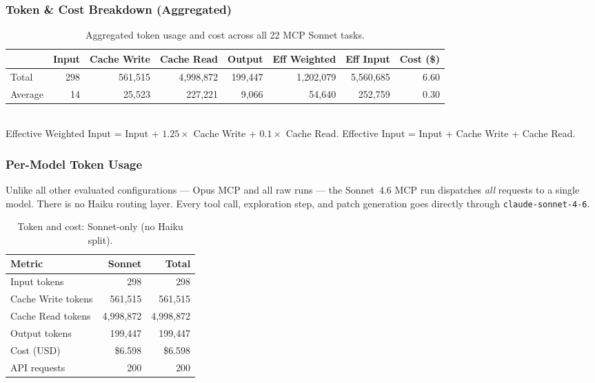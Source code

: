 \subsubsection{Token \& Cost Breakdown (Aggregated)}

\begin{table}[h]
\centering
\small
\caption{Aggregated token usage and cost across all 22 MCP Sonnet tasks.}\label{tab:tokens-agg-mcp-sonnet}
\setlength{\tabcolsep}{4pt}
\begin{tabular}{lrrrrrrr}
\toprule
& \textbf{Input} & \textbf{Cache Write} & \textbf{Cache Read} & \textbf{Output}
& \textbf{Eff Weighted} & \textbf{Eff Input} & \textbf{Cost (\$)} \\
\midrule
Total   &        298 & 561{,}515 & 4{,}998{,}872 & 199{,}447 & 1{,}202{,}079 & 5{,}560{,}685 & 6.60 \\
Average &         14 &  25{,}523 &   227{,}221   &   9{,}066 &    54{,}640   &   252{,}759   & 0.30 \\
\bottomrule
\end{tabular}
\\[4pt]
{\footnotesize
Effective Weighted Input = Input + $1.25 \times$ Cache Write + $0.1 \times$ Cache Read.\quad
Effective Input = Input + Cache Write + Cache Read.}
\end{table}

\subsubsection{Per-Model Token Usage}

Unlike all other evaluated configurations --- Opus MCP and all raw runs ---
the Sonnet~4.6 MCP run dispatches \emph{all} requests to a single model.
There is no Haiku routing layer.
Every tool call, exploration step, and patch generation goes directly
through \texttt{claude-sonnet-4-6}.

\begin{table}[h]
\centering
\caption{Token and cost: Sonnet-only (no Haiku split).}\label{tab:model-split-mcp-sonnet}
\begin{tabular}{lrr}
\toprule
\textbf{Metric} & \textbf{Sonnet} & \textbf{Total} \\
\midrule
Input tokens       &         298 &         298 \\
Cache Write tokens & 561{,}515   & 561{,}515   \\
Cache Read tokens  & 4{,}998{,}872 & 4{,}998{,}872 \\
Output tokens      & 199{,}447   & 199{,}447   \\
Cost (USD)         & \$6.598     & \$6.598     \\
API requests       &         200 &         200 \\
\bottomrule
\end{tabular}
\end{table}

